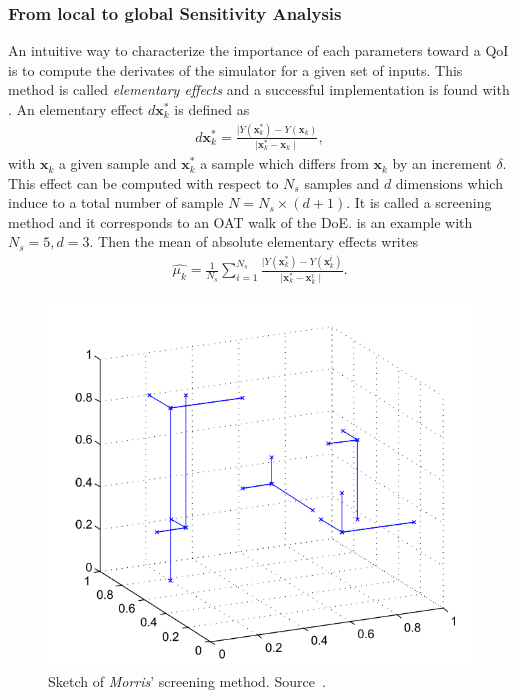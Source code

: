 \subsubsection{From local to global Sensitivity Analysis}

An intuitive way to characterize the importance of each parameters toward a QoI is to compute the derivates of the simulator for a given set of inputs. This method is called \emph{elementary effects} and a successful implementation is found with \citet{morris1991}. An elementary effect $d\mathbf{x}_{k}^*$ is defined as
\begin{align}
d\mathbf{x}_{k}^* = \frac{ \mid Y(\mathbf{x}_{k}^*) -  Y(\mathbf{x}_{k})}{\mid \mathbf{x}_{k}^* - \mathbf{x}_{k}  \mid},
\end{align}
\noindent with $\mathbf{x}_{k}$ a given sample and $\mathbf{x}_{k}^*$ a sample which differs from $\mathbf{x}_{k}$ by an increment $\delta$. This effect can be computed with respect to $N_s$ samples and $d$ dimensions which induce to a total number of sample $N = N_s\times(d + 1)$. It is called a screening method and it corresponds to an OAT walk of the DoE.  is an example with $N_s = 5, d = 3$. Then the mean of absolute elementary effects writes
\begin{align}
\hat{\mu_k} = \frac{1}{N_s} \sum_{i=1}^{N_s} \frac{ \mid Y(\mathbf{x}_{k}^*) -  Y(\mathbf{x}_{k}^i)}{\mid \mathbf{x}_{k}^* - \mathbf{x}_{k}^i  \mid}.
\end{align}

\begin{figure}[H]
\centering
\includegraphics[width=0.8\linewidth,keepaspectratio]{fig/literature/morris.png}
\caption{Sketch of \emph{Morris}' screening method. Source~\cite{Becker2018}.}
\label{fig:morris}
\end{figure}

